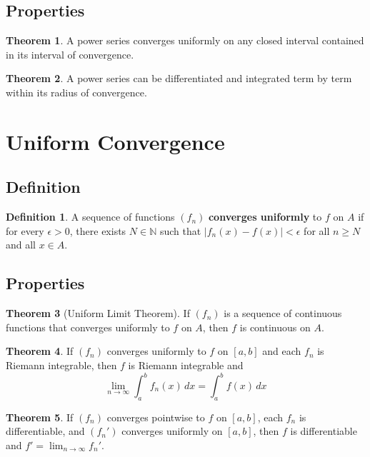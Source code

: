 \documentclass[11pt]{article}
\theoremstyle{definition}
\newtheorem{definition}{Definition}[section]
\newtheorem{theorem}{Theorem}[section]
\begin{document}
\subsection{Properties}
\begin{theorem}
A power series converges uniformly on any closed interval contained in its interval of convergence.
\end{theorem}

\begin{theorem}
A power series can be differentiated and integrated term by term within its radius of convergence.
\end{theorem}

\section{Uniform Convergence}

\subsection{Definition}
\begin{definition}
A sequence of functions $(f_n)$ \textbf{converges uniformly} to $f$ on $A$ if for every $\epsilon > 0$, there exists $N \in \mathbb{N}$ such that $|f_n(x) - f(x)| < \epsilon$ for all $n \geq N$ and all $x \in A$.
\end{definition}

\subsection{Properties}
\begin{theorem}[Uniform Limit Theorem]
If $(f_n)$ is a sequence of continuous functions that converges uniformly to $f$ on $A$, then $f$ is continuous on $A$.
\end{theorem}

\begin{theorem}
If $(f_n)$ converges uniformly to $f$ on $[a,b]$ and each $f_n$ is Riemann integrable, then $f$ is Riemann integrable and
$$\lim_{n \to \infty} \int_a^b f_n(x) \, dx = \int_a^b f(x) \, dx$$
\end{theorem}

\begin{theorem}
If $(f_n)$ converges pointwise to $f$ on $[a,b]$, each $f_n$ is differentiable, and $(f_n')$ converges uniformly on $[a,b]$, then $f$ is differentiable and $f' = \lim_{n \to \infty} f_n'$.
\end{theorem}
\end{document}
